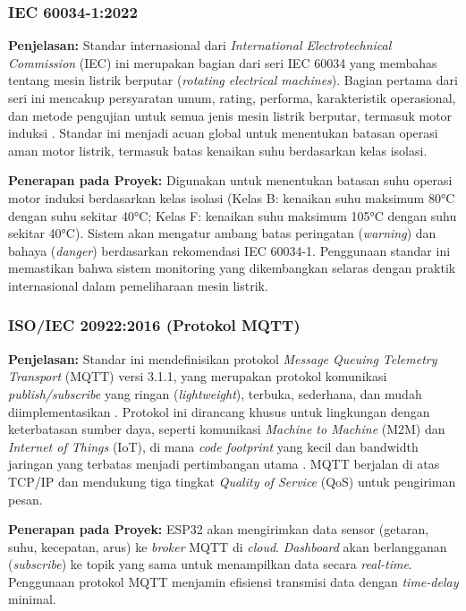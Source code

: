 \documentclass{elsinta}
\begin{document}
\subsubsection{IEC 60034-1:2022}

\textbf{Penjelasan:} Standar internasional dari \textit{International Electrotechnical Commission} (IEC) ini merupakan bagian dari seri IEC 60034 yang membahas tentang mesin listrik berputar (\textit{rotating electrical machines}). Bagian pertama dari seri ini mencakup persyaratan umum, rating, performa, karakteristik operasional, dan metode pengujian untuk semua jenis mesin listrik berputar, termasuk motor induksi \cite{iec60034_2022}. Standar ini menjadi acuan global untuk menentukan batasan operasi aman motor listrik, termasuk batas kenaikan suhu berdasarkan kelas isolasi.

\textbf{Penerapan pada Proyek:} Digunakan untuk menentukan batasan suhu operasi motor induksi berdasarkan kelas isolasi (Kelas B: kenaikan suhu maksimum 80°C dengan suhu sekitar 40°C; Kelas F: kenaikan suhu maksimum 105°C dengan suhu sekitar 40°C). Sistem akan mengatur ambang batas peringatan (\textit{warning}) dan bahaya (\textit{danger}) berdasarkan rekomendasi IEC 60034-1. Penggunaan standar ini memastikan bahwa sistem monitoring yang dikembangkan selaras dengan praktik internasional dalam pemeliharaan mesin listrik.

\subsubsection{ISO/IEC 20922:2016 (Protokol MQTT)}

\textbf{Penjelasan:} Standar ini mendefinisikan protokol \textit{Message Queuing Telemetry Transport} (MQTT) versi 3.1.1, yang merupakan protokol komunikasi \textit{publish/subscribe} yang ringan (\textit{lightweight}), terbuka, sederhana, dan mudah diimplementasikan \cite{mqtt_2016}. Protokol ini dirancang khusus untuk lingkungan dengan keterbatasan sumber daya, seperti komunikasi \textit{Machine to Machine} (M2M) dan \textit{Internet of Things} (IoT), di mana \textit{code footprint} yang kecil dan bandwidth jaringan yang terbatas menjadi pertimbangan utama \cite{mqtt_2016}. MQTT berjalan di atas TCP/IP dan mendukung tiga tingkat \textit{Quality of Service} (QoS) untuk pengiriman pesan.

\textbf{Penerapan pada Proyek:} ESP32 akan mengirimkan data sensor (getaran, suhu, kecepatan, arus) ke \textit{broker} MQTT di \textit{cloud}. \textit{Dashboard} akan berlangganan (\textit{subscribe}) ke topik yang sama untuk menampilkan data secara \textit{real-time}. Penggunaan protokol MQTT menjamin efisiensi transmisi data dengan \textit{time-delay} minimal.
\end{document}
